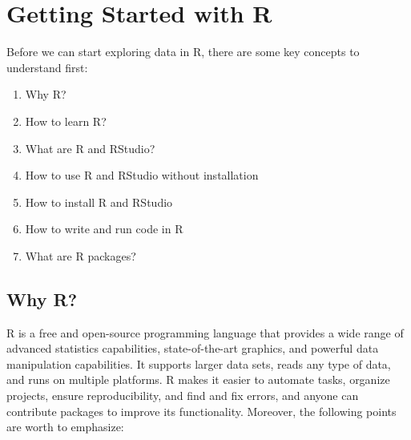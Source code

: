 \documentclass[
  12pt,
  oneside]{book}
\providecommand{\tightlist}{%
  \setlength{\itemsep}{0pt}\setlength{\parskip}{0pt}}
\begin{document}
\hypertarget{getting-started}{%
\chapter{Getting Started with R}\label{getting-started}}

Before we can start exploring data in R, there are some key concepts to understand first:

\begin{enumerate}
\def\labelenumi{\arabic{enumi}.}
\tightlist
\item
  Why R?
\item
  How to learn R?
\item
  What are R and RStudio?
\item
  How to use R and RStudio without installation
\item
  How to install R and RStudio
\item
  How to write and run code in R
\item
  What are R packages?
\end{enumerate}

\hypertarget{sec:whyR}{%
\section{Why R?}\label{sec:whyR}}

R is a free and open-source programming language that provides a wide range of advanced statistics capabilities, state-of-the-art graphics, and powerful data manipulation capabilities. It supports larger data sets, reads any type of data, and runs on multiple platforms. R makes it easier to automate tasks, organize projects, ensure reproducibility, and find and fix errors, and anyone can contribute packages to improve its functionality. Moreover, the following points are worth to emphasize:
\end{document}
